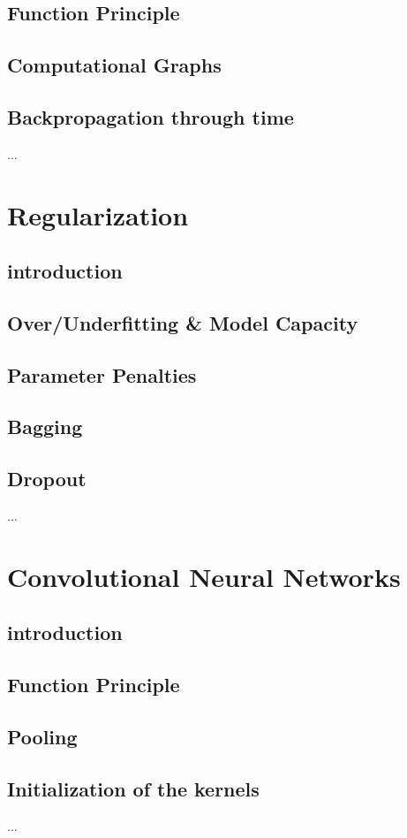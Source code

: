 \documentclass[a4paper,10pt,titlepage]{report}
\begin{document}
\subsection{Function Principle}
\subsection{Computational Graphs}
\subsection{Backpropagation through time}
...


\newpage
\section{Regularization}
\subsection{introduction}
\subsection{Over/Underfitting \& Model Capacity}
\subsection{Parameter Penalties}
\subsection{Bagging}
\subsection{Dropout}
...

\newpage
\section{Convolutional Neural Networks}
\subsection{introduction}
\subsection{Function Principle}
\subsection{Pooling}
\subsection{Initialization of the kernels}
...
\end{document}
